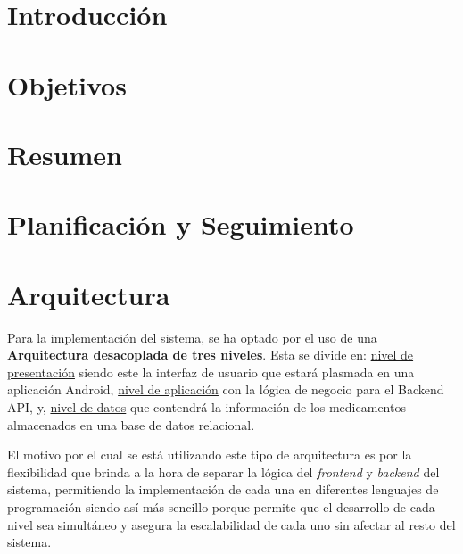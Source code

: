 \documentclass[12pt, a4paper]{report}
\begin{document}
\setcounter{page}{1}

\chapter{Introducción}
\newpage

\chapter{Objetivos}
\newpage

\chapter{Resumen}
\newpage

\chapter{Planificación y Seguimiento}
\newpage

\chapter{Arquitectura}
Para la implementación del sistema, se ha optado por el uso de una \textbf{Arquitectura desacoplada de tres niveles}. Esta se divide en: 
\uline{nivel de presentación} siendo este la interfaz de usuario que estará plasmada en una aplicación Android, \uline{nivel de aplicación} 
con la lógica de negocio para el Backend API, y, \uline{nivel de datos} que contendrá la información de los medicamentos almacenados en una base 
de datos relacional\cite{1}.

El motivo por el cual se está utilizando este tipo de arquitectura es por la flexibilidad que brinda a la hora de separar la lógica del \textit{frontend} 
y \textit{backend} del sistema, permitiendo la implementación de cada una en diferentes lenguajes de programación siendo así más sencillo porque permite 
que el desarrollo de cada nivel sea simultáneo y asegura la escalabilidad de cada uno sin afectar al resto del sistema\cite{1}.
\end{document}
